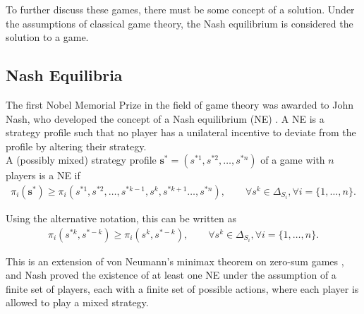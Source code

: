 To further discuss these games, there must be some concept of a solution. Under the assumptions of classical game theory, the Nash equilibrium is considered the solution to a game. 

\subsection{Nash Equilibria} \label{NE_def}
The first Nobel Memorial Prize in the field of game theory was awarded to John Nash, who developed the concept of a Nash equilibrium (NE) \cite{RN78}. A NE is a strategy profile such that no player has a unilateral incentive to deviate from the profile by altering their strategy. \\


A (possibly mixed) strategy profile $\mathbf{s^*} = (s^{*1}, s^{*2}, \dots, s^{*n})$ of a game with $n$ players is a NE if \\
\begin{align}
    \pi_i(\mathbf{s^*}) \geq \pi_i(s^{*1}, s^{*2},\dots, s^{*k-1}, s^{k}, s^{*k+1} \dots, s^{*n}), \qquad \forall  s^{k} \in \Delta_{ S_i}, \forall i =\{1, \dots, n\}. \label{NE}
\end{align}


Using the alternative notation, this can be written as \\
\begin{align*}
    \pi_i(s^{*k},s^{*-k}) \geq \pi_i(s^k,s^{*-k}), \qquad \forall  s^k \in \Delta_{ S_i}, \forall i =\{1, \dots, n\}.
\end{align*}

This is an extension of von Neumann's minimax theorem on zero-sum games \cite{RN99}, and Nash proved the existence of at least one NE under the assumption of a finite set of players, each with a finite set of possible actions, where each player is allowed to play a mixed strategy. 


